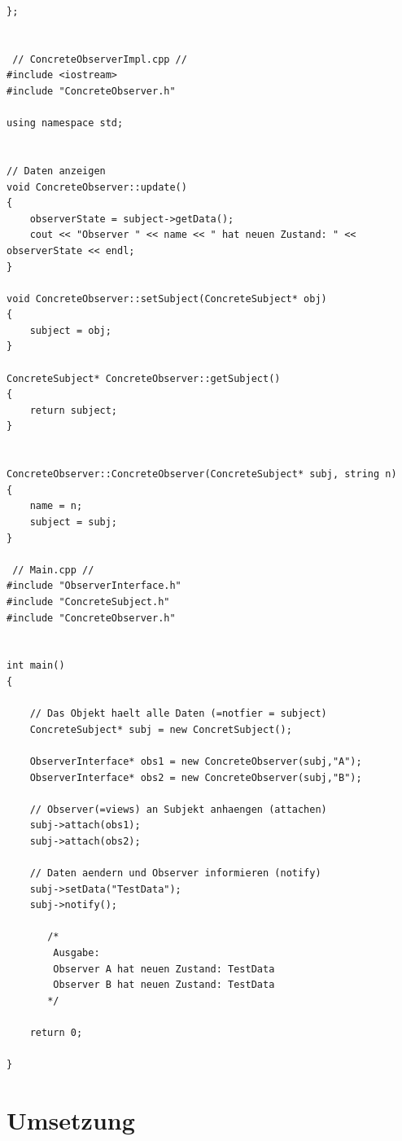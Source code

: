\begin{lstlisting}
};


 // ConcreteObserverImpl.cpp // 
#include <iostream> 
#include "ConcreteObserver.h" 
  
using namespace std; 
  
  
// Daten anzeigen 
void ConcreteObserver::update() 
{ 
    observerState = subject->getData(); 
    cout << "Observer " << name << " hat neuen Zustand: " << observerState << endl; 
} 
  
void ConcreteObserver::setSubject(ConcreteSubject* obj) 
{ 
    subject = obj; 
} 
  
ConcreteSubject* ConcreteObserver::getSubject() 
{ 
    return subject; 
} 
  
  
ConcreteObserver::ConcreteObserver(ConcreteSubject* subj, string n) 
{ 
    name = n; 
    subject = subj; 
}

 // Main.cpp // 
#include "ObserverInterface.h" 
#include "ConcreteSubject.h" 
#include "ConcreteObserver.h" 
  
  
int main() 
{ 
  
    // Das Objekt haelt alle Daten (=notfier = subject) 
    ConcreteSubject* subj = new ConcretSubject(); 
    
    ObserverInterface* obs1 = new ConcreteObserver(subj,"A"); 
    ObserverInterface* obs2 = new ConcreteObserver(subj,"B"); 
  
    // Observer(=views) an Subjekt anhaengen (attachen) 
    subj->attach(obs1); 
    subj->attach(obs2); 
  
    // Daten aendern und Observer informieren (notify) 
    subj->setData("TestData"); 
    subj->notify(); 
  
       /* 
        Ausgabe: 
        Observer A hat neuen Zustand: TestData 
        Observer B hat neuen Zustand: TestData 
       */ 
  
    return 0; 
  
}

\end{lstlisting}

\section{Umsetzung}

